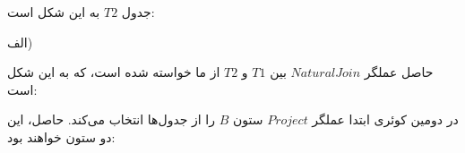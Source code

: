 \begin{LTRbibitems}

\end{LTRbibitems}

جدول 
$T2$
به این شکل است:


\begin{LTRbibitems}
\end{LTRbibitems}



الف)

حاصل عملگر
$Natural Join$
بین
$T1$
و
$T2$
از ما خواسته شده است، که به این شکل است:


\begin{LTRbibitems}
\end{LTRbibitems}


در دومین کوئری
 ابتدا عملگر
$Project$
ستون
$B$
را از جدول‌ها انتخاب می‌کند.
حاصل، این دو ستون خواهند بود:


